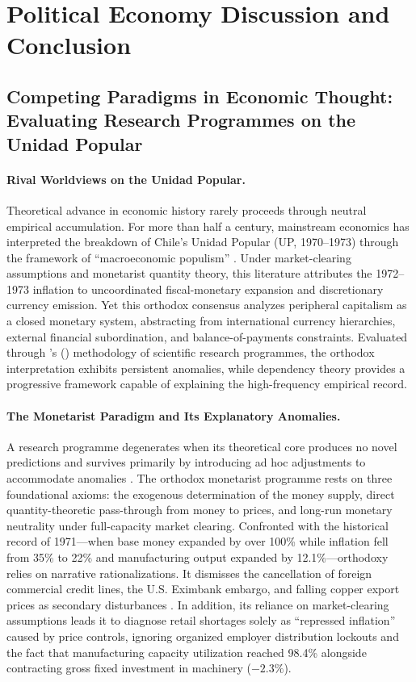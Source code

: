 \section{Political Economy Discussion and Conclusion}
\label{sec:discussion_conclusion}

\subsection{Competing Paradigms in Economic Thought: Evaluating Research Programmes on the Unidad Popular}
\label{sec:competing_paradigms}

\paragraph{Rival Worldviews on the Unidad Popular.}
Theoretical advance in economic history rarely proceeds through neutral empirical accumulation. For more than half a century, mainstream economics has interpreted the breakdown of Chile's Unidad Popular (UP, 1970--1973) through the framework of ``macroeconomic populism'' \citep{DornbuschEdwards1990,Edwards2024}. Under market-clearing assumptions and monetarist quantity theory, this literature attributes the 1972--1973 inflation to uncoordinated fiscal-monetary expansion and discretionary currency emission. Yet this orthodox consensus analyzes peripheral capitalism as a closed monetary system, abstracting from international currency hierarchies, external financial subordination, and balance-of-payments constraints. Evaluated through \citeauthor{Lakatos1978}'s (\citeyear{Lakatos1978}) methodology of scientific research programmes, the orthodox interpretation exhibits persistent anomalies, while dependency theory \citep{Kvangraven2021} provides a progressive framework capable of explaining the high-frequency empirical record.

\paragraph{The Monetarist Paradigm and Its Explanatory Anomalies.}
A research programme degenerates when its theoretical core produces no novel predictions and survives primarily by introducing ad hoc adjustments to accommodate anomalies \citep{Lakatos1978}. The orthodox monetarist programme rests on three foundational axioms: the exogenous determination of the money supply, direct quantity-theoretic pass-through from money to prices, and long-run monetary neutrality under full-capacity market clearing. Confronted with the historical record of 1971---when base money expanded by over 100\% while inflation fell from 35\% to 22\% and manufacturing output expanded by 12.1\%---orthodoxy relies on narrative rationalizations. It dismisses the cancellation of foreign commercial credit lines, the U.S. Eximbank embargo, and falling copper export prices as secondary disturbances \citep{Edwards2024}. In addition, its reliance on market-clearing assumptions leads it to diagnose retail shortages solely as ``repressed inflation'' caused by price controls, ignoring organized employer distribution lockouts and the fact that manufacturing capacity utilization reached 98.4\% alongside contracting gross fixed investment in machinery ($-2.3\%$).

